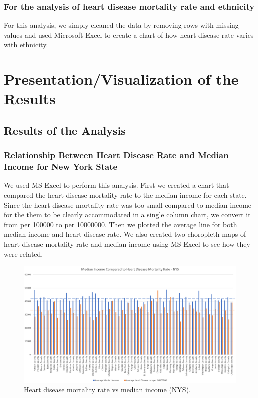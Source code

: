 \documentclass[journal,12pt,onecolumn]{IEEEtran}
\begin{document}
\subsubsection{For the analysis of heart disease mortality rate and ethnicity}
For this analysis, we simply cleaned the data by removing rows with missing values and used Microsoft Excel to create a chart of how heart disease rate varies with ethnicity.


\section{Presentation/Visualization of the Results}
\subsection{Results of the Analysis}
\subsubsection{Relationship Between Heart Disease Rate and Median Income for New York State}
We used MS Excel to perform this analysis.
First we created a chart that compared the heart disease mortality rate to the median income for each state.
Since the heart disease mortality rate was too small compared to median income for the them to be clearly accommodated in a single column chart, we convert it from per 100000 to per 10000000.
Then we plotted the average line for both median income and heart disease rate.
We also created two choropleth maps of heart disease mortality rate and median income using MS Excel to see how they were related.

\begin{figure}[H]
\centering
\includegraphics[width=\textwidth]{figures/column.PNG}
\caption{Heart disease mortality rate vs median income (NYS).}
\label{fig:col1}
\end{figure}
\end{document}
